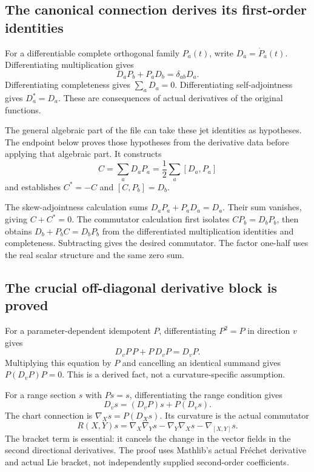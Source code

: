 \subsection{The canonical connection derives its first-order identities}
For a differentiable complete orthogonal family $P_a(t)$, write $D_a=\dot P_a(t)$. Differentiating multiplication gives
\[
D_aP_b+P_aD_b=\delta_{ab}D_a.
\]
Differentiating completeness gives $\sum_aD_a=0$. Differentiating self-adjointness gives $D_a^*=D_a$. These are consequences of actual derivatives of the original functions.


The general algebraic part of the file can take these jet identities as hypotheses. The endpoint below proves those hypotheses from the derivative data before applying that algebraic part. It constructs
\[
C=\sum_aD_aP_a=\frac12\sum_a[D_a,P_a]
\]
and establishes $C^*=-C$ and $[C,P_b]=D_b$.



The skew-adjointness calculation sums $D_aP_a+P_aD_a=D_a$. Their sum vanishes, giving $C+C^*=0$. The commutator calculation first isolates $CP_b=D_bP_b$, then obtains $D_b+P_bC=D_bP_b$ from the differentiated multiplication identities and completeness. Subtracting gives the desired commutator. The factor one-half uses the real scalar structure and the same zero sum.

\subsection{The crucial off-diagonal derivative block is proved}
For a parameter-dependent idempotent $P$, differentiating $P^2=P$ in direction $v$ gives
\[
D_vP\,P+P\,D_vP=D_vP.
\]
Multiplying this equation by $P$ and cancelling an identical summand gives $P(D_vP)P=0$. This is a derived fact, not a curvature-specific assumption.


For a range section $s$ with $Ps=s$, differentiating the range condition gives
\[
D_vs=(D_vP)s+P(D_vs).
\]
The chart connection is $\nabla_Xs=P(D_Xs)$. Its curvature is the actual commutator
\[
R(X,Y)s=\nabla_X\nabla_Ys-\nabla_Y\nabla_Xs-\nabla_{[X,Y]}s.
\]
The bracket term is essential: it cancels the change in the vector fields in the second directional derivatives. The proof uses Mathlib's actual Fréchet derivative and actual Lie bracket, not independently supplied second-order coefficients.


